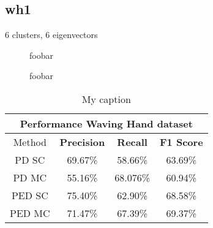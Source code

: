


\subsection{wh1}

6 clusters, 6 eigenvectors

\begin{figure}[H]
\begin{center}
\end{center}
\caption[Segmentations Waving Hand]{foobar}
\label{fig:wh1_performance}
\end{figure}

\begin{figure}[H]
\begin{center}
\end{center}
\caption[Segmentations Waving Hand]{foobar}
\label{fig:wh1_performance}
\end{figure}


\begin{table}[H]
\centering
\begin{tabular}{|c|c|c|c|}
\hline
\multicolumn{4}{|c|}{Performance Waving Hand dataset}                        \\ \hline
Method & \textbf{Precision} & \textbf{Recall} & \textbf{F1 Score} \\ \hline
PD SC & 69.67\%   & 58.66\%     & 63.69\%  \\ \hline
PD MC & 55.16\%   & 68.076\%     & 60.94\%  \\ \hline
PED SC & 75.40\%   & 62.90\%     & 68.58\%  \\ \hline
PED MC & 71.47\%   & 67.39\%     & 69.37\%  \\ \hline               
\end{tabular}
\caption[Cars Varying $\lambda$]{My caption}
\label{tab:wh1_performance}
\end{table}


